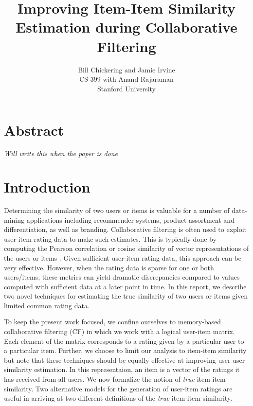 \documentclass[11pt]{article}
\begin{document}

\title{Improving Item-Item Similarity Estimation during Collaborative Filtering}
\author{Bill Chickering and Jamie Irvine\\
CS 399 with Anand Rajaraman\\
Stanford University}
\renewcommand{\today}{March 25, 2014}
\maketitle

\section*{Abstract}
\emph{Will write this when the paper is done}

\section*{Introduction}
Determining the similarity of two users or items is valuable for a
number of data-mining applications including recommender systems, product
assortment and differentiation, as well as branding. Collaborative filtering is
often used to exploit user-item rating data to make such estimates. This is 
typically done by computing the Pearson correlation or cosine similarity of 
vector representations of the users or items \cite{Su2009}. Given sufficient 
user-item rating data, this approach can be very effective. However, when the
rating data is sparse for one or both users/items, these metrics can
yield dramatic discrepancies compared to values computed with sufficient
data at a later point in time. In this report, we describe two novel techniques 
for estimating the true similarity of two users or items given limited common 
rating data.

To keep the present work focused, we confine ourselves to memory-based
collaborative filtering (CF) in which we work with a logical user-item matrix.
Each element of the matrix corresponds to a rating given by a particular user to a
particular item. Further, we choose to limit our analysis to item-item
similarity but note that these techniques should be equally effective at
improving user-user similarity estimation. In this representaion, an item is
a vector of the ratings it has received from all users. We now formalize the 
notion of {\em true} item-item similarity. Two alternative models for the 
generation of user-item ratings are useful in arriving at two different 
definitions of the {\em true} item-item similarity.
\end{document}
